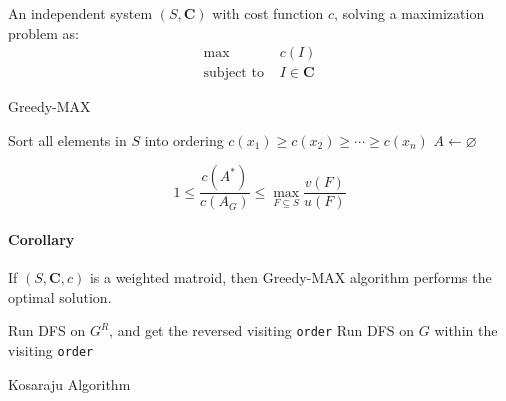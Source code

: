 \documentclass[a4paper]{article}
\begin{document}
\begin{multicols}{2}
\begin{tcolorbox}[title=Greedy-MAX]
    An independent system $(S,\mathbf{C})$ with cost function $c$, solving a maximization problem as:
    \begin{align*}
        \max~ &c(I)\\
        \text{subject to }& I\in\mathbf{C}
    \end{align*}
\begin{algorithm}[H]
    \caption{Greedy-MAX}
    Sort all elements in $S$ into ordering $c(x_1)\geq c(x_2)\geq \cdots \geq c(x_n)$\;
    $A\leftarrow \varnothing$\;
    \;
\end{algorithm}
\begin{equation*}
    1\leq \frac{c(A^*)}{c(A_G)}\leq \max_{F\subseteq S}\frac{v(F)}{u(F)}
\end{equation*}
\paragraph{Corollary} If $(S,\mathbf{C},c)$ is a weighted matroid, then Greedy-MAX algorithm performs the optimal solution.
\end{tcolorbox}

\begin{tcolorbox}[title=Strongly Connected Components]
    \begin{algorithm}[H]
        Run DFS on $G^R$, and get the reversed visiting \texttt{order}\;
            Run DFS on $G$ within the visiting \texttt{order}\;
        \caption{Kosaraju Algorithm}
    \end{algorithm}
\end{tcolorbox}


\end{multicols}
\end{document}
